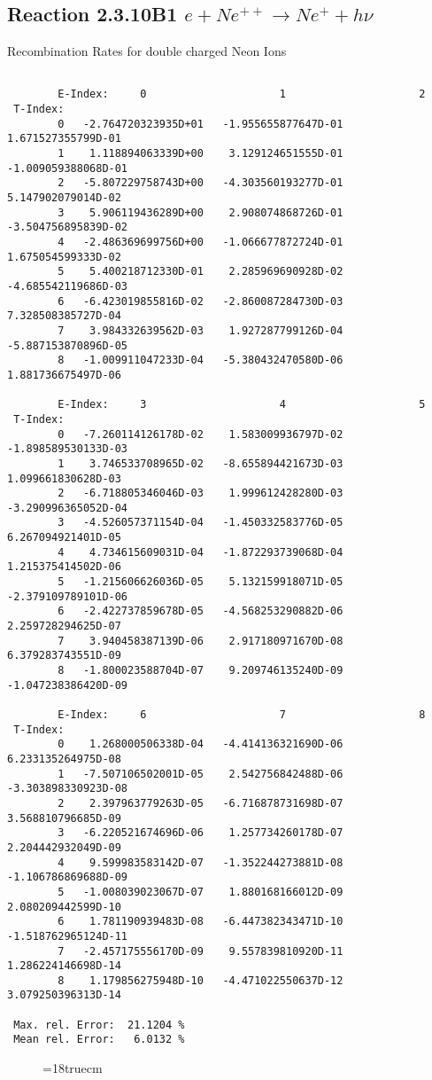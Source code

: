 \subsection{
Reaction 2.3.10B1   $e + Ne^{++}\rightarrow  Ne^+ + h\nu$
}


 Recombination Rates for double
 charged Neon Ions

\begin{verbatim}

        E-Index:     0                     1                     2
 T-Index:
        0   -2.764720323935D+01   -1.955655877647D-01    1.671527355799D-01
        1    1.118894063339D+00    3.129124651555D-01   -1.009059388068D-01
        2   -5.807229758743D+00   -4.303560193277D-01    5.147902079014D-02
        3    5.906119436289D+00    2.908074868726D-01   -3.504756895839D-02
        4   -2.486369699756D+00   -1.066677872724D-01    1.675054599333D-02
        5    5.400218712330D-01    2.285969690928D-02   -4.685542119686D-03
        6   -6.423019855816D-02   -2.860087284730D-03    7.328508385727D-04
        7    3.984332639562D-03    1.927287799126D-04   -5.887153870896D-05
        8   -1.009911047233D-04   -5.380432470580D-06    1.881736675497D-06

        E-Index:     3                     4                     5
 T-Index:
        0   -7.260114126178D-02    1.583009936797D-02   -1.898589530133D-03
        1    3.746533708965D-02   -8.655894421673D-03    1.099661830628D-03
        2   -6.718805346046D-03    1.999612428280D-03   -3.290996365052D-04
        3   -4.526057371154D-04   -1.450332583776D-05    6.267094921401D-05
        4    4.734615609031D-04   -1.872293739068D-04    1.215375414502D-06
        5   -1.215606626036D-05    5.132159918071D-05   -2.379109789101D-06
        6   -2.422737859678D-05   -4.568253290882D-06    2.259728294625D-07
        7    3.940458387139D-06    2.917180971670D-08    6.379283743551D-09
        8   -1.800023588704D-07    9.209746135240D-09   -1.047238386420D-09

        E-Index:     6                     7                     8
 T-Index:
        0    1.268000506338D-04   -4.414136321690D-06    6.233135264975D-08
        1   -7.507106502001D-05    2.542756842488D-06   -3.303898330923D-08
        2    2.397963779263D-05   -6.716878731698D-07    3.568810796685D-09
        3   -6.220521674696D-06    1.257734260178D-07    2.204442932049D-09
        4    9.599983583142D-07   -1.352244273881D-08   -1.106786869688D-09
        5   -1.008039023067D-07    1.880168166012D-09    2.080209442599D-10
        6    1.781190939483D-08   -6.447382343471D-10   -1.518762965124D-11
        7   -2.457175556170D-09    9.557839810920D-11    1.286224146698D-14
        8    1.179856275948D-10   -4.471022550637D-12    3.079250396313D-14

 Max. rel. Error:  21.1204 %
 Mean rel. Error:   6.0132 %

\end{verbatim}
\begin{figure} \label{2.3.10B1}
\epsfxsize=18truecm
\end{figure}
\newpage
